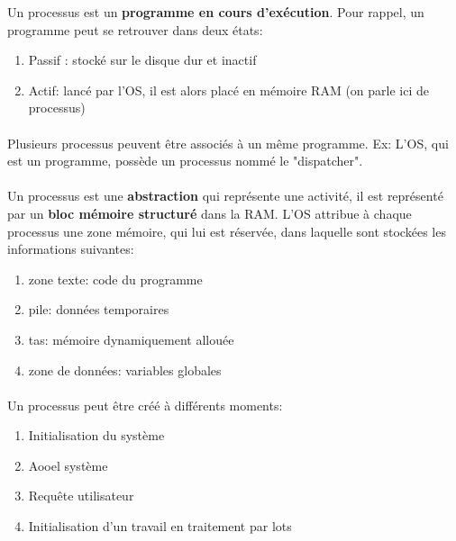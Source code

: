 \item{}
{
Un processus est un \textbf{programme en cours d'exécution}. Pour rappel, un programme peut se retrouver dans deux états:
\begin{enumerate}
\item Passif : stocké sur le disque dur et inactif
\item Actif: lancé par l'OS, il est alors placé en mémoire RAM (on parle ici de processus)
\end{enumerate}
\paragraph{}
Plusieurs processus peuvent être associés à un même programme. Ex: L'OS, qui est un programme, possède un processus nommé le "dispatcher".


\paragraph{}
Un processus est une \textbf{abstraction} qui représente une activité, il est représenté par un \textbf{bloc mémoire structuré} dans la RAM.
L'OS attribue à chaque processus une zone mémoire, qui lui est réservée, dans laquelle sont stockées les informations suivantes:
\begin{enumerate}
\item zone texte: code du programme
\item pile: données temporaires
\item tas: mémoire dynamiquement allouée
\item zone de données: variables globales
\end{enumerate}

\paragraph{}
Un processus peut être créé à différents moments:
\begin{enumerate}
\item Initialisation du système
\item Aooel système
\item Requête utilisateur
\item Initialisation d'un travail en traitement par lots
\end{enumerate}

}
